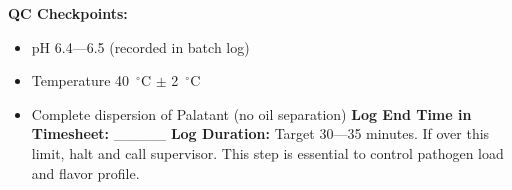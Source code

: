 \textbf{QC Checkpoints:}
\begin{itemize}
\item pH 6.4---6.5 (recorded in batch log)
\item Temperature 40~$^\circ$C $\pm$ 2~$^\circ$C
\item Complete dispersion of Palatant (no oil separation)
\textbf{Log End Time in Timesheet:} \_\_\_\_\_
\textbf{Log Duration:} Target 30---35 minutes. If over this limit, halt and call supervisor. This step is essential to control pathogen load and flavor profile. 
\end{itemize}


